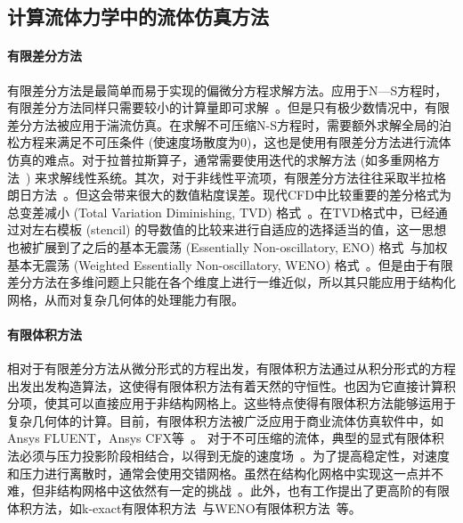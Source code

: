 \subsection{计算流体力学中的流体仿真方法}
\paragraph{有限差分方法}
有限差分方法是最简单而易于实现的偏微分方程求解方法。应用于N—S方程时，有限差分方法同样只需要较小的计算量即可求解~\cite{vreman2014comparison, kooij2018comparison}。但是只有极少数情况中，有限差分方法被应用于湍流仿真。在求解不可压缩N-S方程时，需要额外求解全局的泊松方程来满足不可压条件 (使速度场散度为0)，这也是使用有限差分方法进行流体仿真的难点。对于拉普拉斯算子，通常需要使用迭代的求解方法 (如多重网格方法~\cite{golub2013matrix}) 来求解线性系统。其次，对于非线性平流项，有限差分方法往往采取半拉格朗日方法~\cite{smolarkiewicz1992class}。但这会带来很大的数值粘度误差。现代CFD中比较重要的差分格式为总变差减小 (Total Variation Diminishing, TVD) 格式~\cite{HARTEN1983357, osher1986very, YEE1985327}。在TVD格式中，已经通过对左右模板 (stencil) 的导数值的比较来进行自适应的选择适当的值，这一思想也被扩展到了之后的基本无震荡 (Essentially Non-oscillatory, ENO) 格式~\cite{HARTEN19973, SHU1988439, SHU198932}与加权基本无震荡 (Weighted Essentially Non-oscillatory, WENO) 格式~\cite{LIU1994200}。但是由于有限差分方法在多维问题上只能在各个维度上进行一维近似，所以其只能应用于结构化网格，从而对复杂几何体的处理能力有限。

\paragraph{有限体积方法}
相对于有限差分方法从微分形式的方程出发，有限体积方法通过从积分形式的方程出发出发构造算法，这使得有限体积方法有着天然的守恒性。也因为它直接计算积分项，使其可以直接应用于非结构网格上。这些特点使得有限体积方法能够运用于复杂几何体的计算。目前，有限体积方法被广泛应用于商业流体仿真软件中，如Ansys FLUENT，Ansys CFX等~\cite{JEONG201419}。 
对于不可压缩的流体，典型的显式有限体积法必须与压力投影阶段相结合，以得到无旋的速度场~\cite{pember1996higher, https://doi.org/10.1002/fld.310}。为了提高稳定性，对速度和压力进行离散时，通常会使用交错网格。虽然在结构化网格中实现这一点并不难，但非结构网格中这依然有一定的挑战~\cite{bermudez1998upwind, herbin2012staggered, gao2012unstructured}。此外，也有工作提出了更高阶的有限体积方法，如k-exact有限体积方法~\cite{barth1990higher}与WENO有限体积方法~\cite{HU199997}等。

